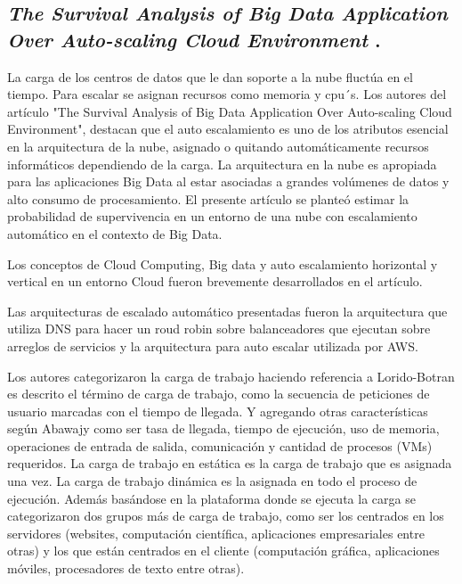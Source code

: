 \subsection{
    \textbf{\emph{The Survival Analysis of Big Data Application
            Over Auto-scaling Cloud Environment}
    }
    .
}

La carga de los centros de datos que le dan soporte a la nube fluctúa en el tiempo.
Para escalar se asignan recursos como memoria y cpu´s.
Los autores del artículo "The Survival Analysis of Big Data Application
Over Auto-scaling Cloud Environment"\cite[pág. 155]{somaniEmerging2019}, destacan que el auto escalamiento es uno de los atributos esencial en la arquitectura de la nube, asignado o quitando automáticamente recursos informáticos dependiendo de la carga.
La arquitectura en la nube es apropiada para las aplicaciones Big Data al estar asociadas a grandes volúmenes de datos y alto consumo de procesamiento.
El presente artículo se planteó estimar la probabilidad de supervivencia
en un entorno de una nube con escalamiento automático en el contexto de Big Data.
\par

Los conceptos de Cloud Computing, Big data y auto escalamiento horizontal y vertical en un entorno Cloud fueron brevemente desarrollados en el artículo.
\par

Las arquitecturas de escalado automático presentadas fueron la arquitectura que utiliza DNS para hacer un roud robin sobre balanceadores que ejecutan sobre arreglos de servicios y la arquitectura para auto escalar utilizada por AWS.
\par


Los autores categorizaron la carga de trabajo
haciendo referencia a Lorido-Botran es descrito el término de carga de trabajo,
como la secuencia de peticiones de usuario marcadas con el tiempo de llegada. Y agregando otras características según Abawajy como ser tasa de llegada, tiempo de ejecución, uso de memoria, operaciones de entrada de salida, comunicación y cantidad de procesos (VMs) requeridos. La carga de trabajo en estática
es la carga de trabajo que es asignada una vez. La carga de trabajo dinámica es la asignada en todo el proceso de ejecución.
Además basándose en la plataforma donde se ejecuta la carga se categorizaron dos grupos más de carga de trabajo, como ser los centrados en los servidores (websites, computación científica, aplicaciones empresariales entre otras) y los que están centrados en el cliente (computación gráfica, aplicaciones móviles, procesadores de texto entre otras).
\par


